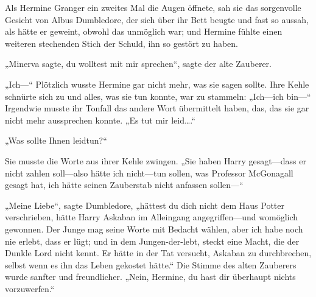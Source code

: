 Als Hermine Granger ein zweites Mal die Augen öffnete, sah sie das sorgenvolle Gesicht von Albus Dumbledore, der sich über ihr Bett beugte und fast so aussah, als hätte er geweint, obwohl das unmöglich war; und Hermine fühlte einen weiteren stechenden Stich der Schuld, ihn so gestört zu haben.

„Minerva sagte, du wolltest mit mir sprechen“, sagte der alte Zauberer.


„Ich—“ Plötzlich wusste Hermine gar nicht mehr, was sie sagen sollte. Ihre Kehle schnürte sich zu und alles, was sie tun konnte, war zu stammeln: „Ich—ich bin—“ Irgendwie musste ihr Tonfall das andere Wort übermittelt haben, das, das sie gar nicht mehr aussprechen konnte. „Es tut mir leid….“

„Was sollte Ihnen leidtun?“

Sie musste die Worte aus ihrer Kehle zwingen. „Sie haben Harry gesagt—dass er nicht zahlen soll—also hätte ich nicht—tun sollen, was Professor McGonagall gesagt hat, ich hätte seinen Zauberstab nicht anfassen sollen—“

„Meine Liebe“, sagte Dumbledore, „hättest du dich nicht dem Haus Potter verschrieben, hätte Harry Askaban im Alleingang angegriffen—und womöglich gewonnen. Der Junge mag seine Worte mit Bedacht wählen, aber ich habe noch nie erlebt, dass er lügt; und in dem Jungen-der-lebt, steckt eine Macht, die der Dunkle Lord nicht kennt. Er hätte in der Tat versucht, Askaban zu durchbrechen, selbst wenn es ihn das Leben gekostet hätte.“ Die Stimme des alten Zauberers wurde sanfter und freundlicher. „Nein, Hermine, du hast dir überhaupt nichts vorzuwerfen.“

